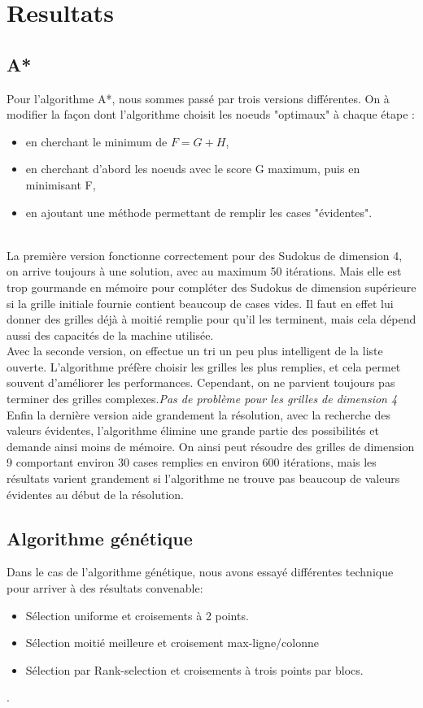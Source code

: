 \chapter{Resultats}
    \section{A*}
    Pour l'algorithme A*, nous sommes passé par trois versions différentes. On à modifier la façon dont l'algorithme choisit les noeuds "optimaux" à chaque étape :\\
    \begin{itemize}
    	\item en cherchant le minimum de $F=G+H$,
    	\item en cherchant d'abord les noeuds avec le score G maximum, puis en minimisant F,
    	\item en ajoutant une méthode permettant de remplir les cases "évidentes".
    \end{itemize} 
    ~\\
    La première version fonctionne correctement pour des Sudokus de dimension 4, on arrive toujours à une solution, avec au maximum 50 itérations. Mais elle est trop gourmande en mémoire pour compléter des Sudokus de dimension supérieure si la grille initiale fournie contient beaucoup de cases vides. Il faut en effet lui donner des grilles déjà à moitié remplie pour qu'il les terminent, mais cela dépend aussi des capacités de la machine utilisée. \\
    
    Avec la seconde version, on effectue un tri un peu plus intelligent de la liste ouverte. L'algorithme préfère choisir les grilles les plus remplies, et cela permet souvent d'améliorer les performances. Cependant, on ne parvient toujours pas terminer des grilles complexes.\textit{Pas de problème pour les grilles de dimension 4}\\
    
    Enfin la dernière version aide grandement la résolution, avec la recherche des valeurs évidentes, l'algorithme élimine une grande partie des possibilités et demande ainsi moins de mémoire. On ainsi peut résoudre des grilles de dimension 9 comportant environ 30 cases remplies en environ 600 itérations, mais les résultats varient grandement si l'algorithme ne trouve pas beaucoup de valeurs évidentes au début de la résolution.
    
    \section{Algorithme génétique}
        Dans le cas de l'algorithme génétique, nous avons essayé différentes technique pour arriver à des résultats convenable:
        \begin{itemize}
            \item Sélection uniforme et croisements à 2 points.
            \item Sélection moitié meilleure et croisement max-ligne/colonne
            \item Sélection par Rank-selection et croisements à trois points par blocs.
        \end{itemize}.\\

